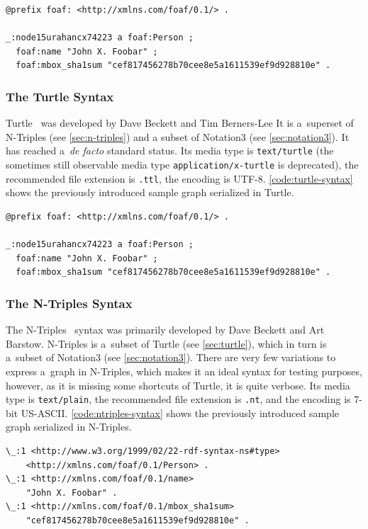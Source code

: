 \begin{lstlisting}[caption={A sample graph in Notation3 syntax.},label={code:notation3-syntax}]
@prefix foaf: <http://xmlns.com/foaf/0.1/> .

_:node15urahancx74223 a foaf:Person ;
  foaf:name "John X. Foobar" ;
  foaf:mbox_sha1sum "cef817456278b70cee8e5a1611539ef9d928810e" .
\end{lstlisting}

\subsubsection{The Turtle Syntax} \label{sec:turtle}
Turtle~\cite{Prudhommeaux2011} was developed by Dave Beckett and Tim Berners-Lee
It is a~superset of N-Triples (see \autoref{sec:n-triples}) and
a subset of Notation3 (see \autoref{sec:notation3}).
It has reached a~\emph{de facto} standard status.
Its media type is \texttt{text/turtle}
(the sometimes still observable media type \texttt{application/x-turtle} is deprecated),
the recommended file extension is \texttt{.ttl}, the encoding is UTF-8.
\autoref{code:turtle-syntax} shows the previously introduced sample graph serialized in Turtle.

\begin{lstlisting}[caption={A sample graph in Turtle syntax.},label={code:turtle-syntax}]
@prefix foaf: <http://xmlns.com/foaf/0.1/> .

_:node15urahancx74223 a foaf:Person ;
  foaf:name "John X. Foobar" ;
  foaf:mbox_sha1sum "cef817456278b70cee8e5a1611539ef9d928810e" .
\end{lstlisting}

\subsubsection{The N-Triples Syntax} \label{sec:n-triples}
The N-Triples~\cite{Grant2004} syntax was primarily developed by Dave Beckett and Art Barstow.
N-Triples is a~subset of Turtle (see \autoref{sec:turtle}),
which in turn is a~subset of Notation3 (see \autoref{sec:notation3}).
There are very few variations to express a~graph in N-Triples,
which makes it an ideal syntax for testing purposes, however,
as it is missing some shortcuts of Turtle, it is quite verbose.
Its media type is \texttt{text/plain}, the recommended file extension is \texttt{.nt},
and the encoding is 7-bit US-ASCII.
\autoref{code:ntriples-syntax} shows the previously introduced sample graph serialized in N-Triples.

\begin{lstlisting}[caption={A sample graph in N-Triples syntax.},label={code:ntriples-syntax}]
\_:1 <http://www.w3.org/1999/02/22-rdf-syntax-ns#type>
    <http://xmlns.com/foaf/0.1/Person> .
\_:1 <http://xmlns.com/foaf/0.1/name>
    "John X. Foobar" .
\_:1 <http://xmlns.com/foaf/0.1/mbox_sha1sum>
    "cef817456278b70cee8e5a1611539ef9d928810e" .
\end{lstlisting}

